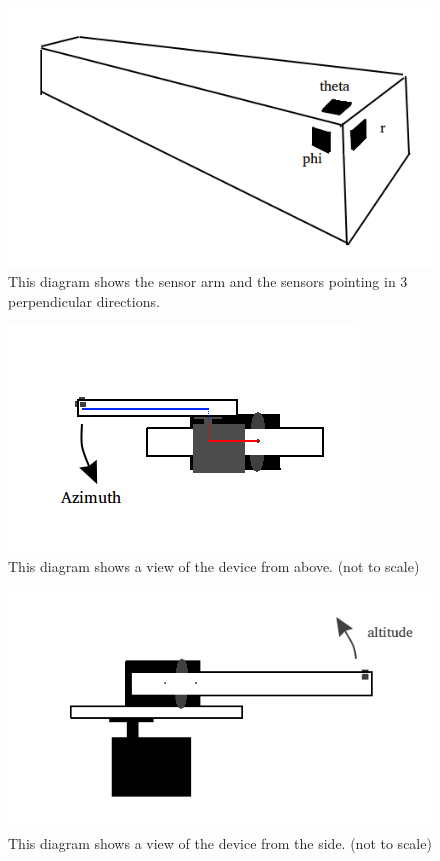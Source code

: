 \documentclass[]{article}
\begin{document}
\begin{figure}
\begin{center}
\caption{This diagram shows the sensor arm and the sensors pointing in 3 perpendicular directions. \label{fig:axes}}
\includegraphics[width=.9\linewidth]{sensor_axes}
\end{center}
\end{figure}

\begin{figure}
\begin{center}
\caption{This diagram shows a view of the device from above. (not to scale) \label{fig:topv}}
\includegraphics[width=.9\linewidth]{top_view}
\end{center}
\end{figure}

\begin{figure}
\begin{center}
\caption{This diagram shows a view of the device from the side. (not to scale) \label{fig:sidev}}
\includegraphics[width=.9\linewidth]{side_view}
\end{center}
\end{figure}
\end{document}
